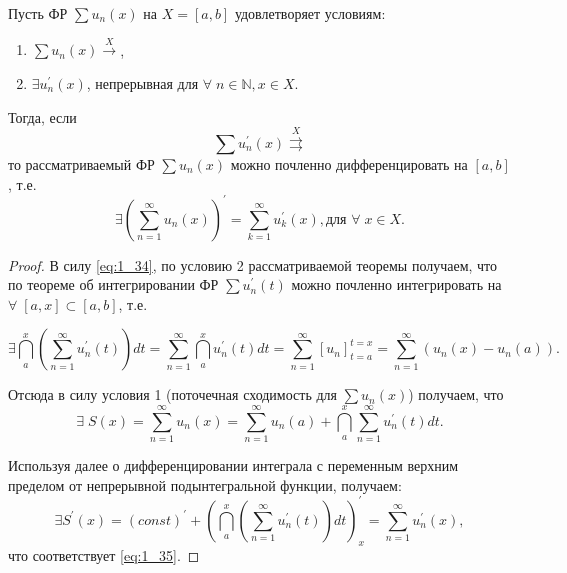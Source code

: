 
\begin{theorem}
	Пусть ФР $\sum u_n(x)$ на $X = [a,b]$ удовлетворяет условиям:
	\begin{enumerate}
		\item $\sum u_n(x) \overset{X}{\rightarrow}$,
		\item $\exists u_n^{'}(x)$, непрерывная для $\forall \; n \in \mathbb{N}, x \in X$.
	\end{enumerate}
	Тогда, если
    \begin{equation}
        \label{eq:1_34}
        \sum u_n^{'}(x) \overset{X}{\rightrightarrows}
    \end{equation}
    то рассматриваемый ФР $\sum u_n(x)$ можно почленно дифференцировать на $[a,b]$, т.е.
	\begin{equation}
	\label{eq:1_35}
	\exists \left( \sum_{n=1}^{\infty} u_n (x) \right)^{'} = \sum_{k=1}^{\infty} u_k^{'}(x), \text{для }\forall \; x \in X.
	\end{equation}
\end{theorem}
\begin{proof}
	В силу \eqref{eq:1_34}, по условию 2 рассматриваемой теоремы получаем, что по теореме об интегрировании ФР $\sum u_n^{'}(t)$ можно почленно интегрировать на
    	$\forall \; [a,x] \subset [a,b]$, \nolinebreak т.е.

    \begin{equation*}
        \exists \dint\limits_a^x \left(\sum\limits_{n=1}^{\infty} u_n^{'}(t)\right)dt = \sum_{n=1}^{\infty} \dint\limits_a^x u_n^{'}(t)dt = \sum_{n=1}^{\infty} [u_n]^{t = x}_{t = a} = \sum\limits_{n=1}^{\infty}\left(u_n(x) - u_n(a)\right).
    \end{equation*}

	Отсюда в силу условия 1 (поточечная сходимость для $\sum u_n(x)$) получаем, что
    \begin{equation*}
            \exists \; S(x) = \sum\limits_{n=1}^{\infty} u_n(x) = \sum\limits_{n=1}^{\infty}u_n(a) + \dint\limits_a^x \sum\limits_{n=1}^{\infty}u_n^{'}(t)dt.
    \end{equation*}

	Используя далее  о дифференцировании интеграла с переменным верхним пределом от непрерывной подынтегральной функции, получаем:\\
	\begin{equation*}
	\exists S^{'}(x) = (const)^{'} + \left(\dint\limits_a^x \left( \sum\limits_{n=1}^{\infty} u_n^{'} (t) \right)dt \right)^{'}_x = \sum\limits_{n=1}^{\infty}u_n^{'} (x),
	\end{equation*} что соответствует \eqref{eq:1_35}.
\end{proof}
